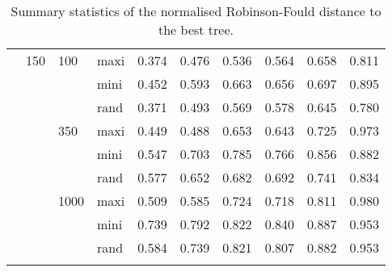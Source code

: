 \begin{longtable}{llllrrrrrr}
   & 150 & 100 & maxi & 0.374 & 0.476 & 0.536 & 0.564 & 0.658 & 0.811 \\ 
   &  &  & mini & 0.452 & 0.593 & 0.663 & 0.656 & 0.697 & 0.895 \\ 
   &  &  & rand & 0.371 & 0.493 & 0.569 & 0.578 & 0.645 & 0.780 \\ 
   &  & 350 & maxi & 0.449 & 0.488 & 0.653 & 0.643 & 0.725 & 0.973 \\ 
   &  &  & mini & 0.547 & 0.703 & 0.785 & 0.766 & 0.856 & 0.882 \\ 
   &  &  & rand & 0.577 & 0.652 & 0.682 & 0.692 & 0.741 & 0.834 \\ 
   &  & 1000 & maxi & 0.509 & 0.585 & 0.724 & 0.718 & 0.811 & 0.980 \\ 
   &  &  & mini & 0.739 & 0.792 & 0.822 & 0.840 & 0.887 & 0.953 \\ 
   &  &  & rand & 0.584 & 0.739 & 0.821 & 0.807 & 0.882 & 0.953 \\ 
   \hline
\hline
\caption{Summary statistics of the normalised Robinson-Fould distance to the best tree.} 
\label{Full_Tab_SummaryRFbest}
\end{longtable}
